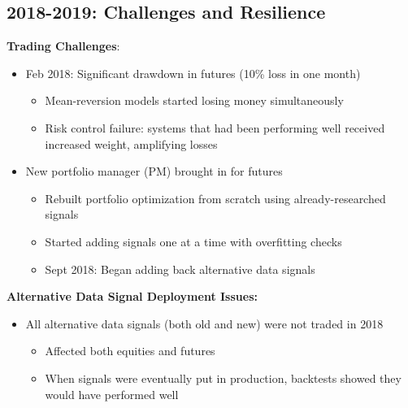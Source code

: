 \documentclass[11pt, letterpaper]{article}
\begin{document}
  \subsection{2018-2019: Challenges and Resilience}
  \label{challenges-and-resilience}

  \textbf{Trading Challenges}:

  \begin{itemize}
    \item Feb 2018: Significant drawdown in futures (10\% loss in one
      month)

      \begin{itemize}
        \item Mean-reversion models started losing money simultaneously

        \item Risk control failure: systems that had been performing
          well received increased weight, amplifying losses
      \end{itemize}

    \item New portfolio manager (PM) brought in for futures

      \begin{itemize}
        \item Rebuilt portfolio optimization from scratch using already-researched
          signals

        \item Started adding signals one at a time with overfitting checks

        \item Sept 2018: Began adding back alternative data signals
      \end{itemize}
  \end{itemize}

  \textbf{Alternative Data Signal Deployment Issues:}

  \begin{itemize}
    \item All alternative data signals (both old and new) were not traded
      in 2018

      \begin{itemize}
        \item Affected both equities and futures

        \item When signals were eventually put in production, backtests
          showed they would have performed well
      \end{itemize}
  \end{itemize}
\end{document}
